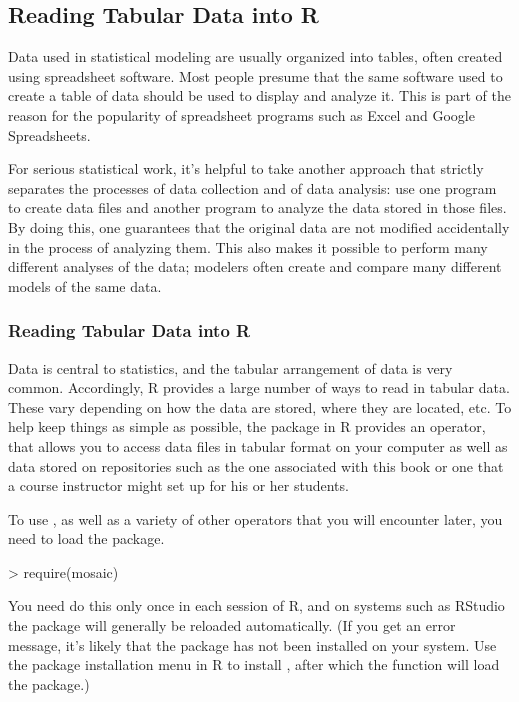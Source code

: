 
\subsection{Reading Tabular Data into R}

Data used in statistical modeling are usually organized into tables, 
often created using spreadsheet software. Most people
presume that the same software used to create a table of data should
be used to display and analyze it.  This is part of the reason for the
popularity of spreadsheet programs such as Excel and Google Spreadsheets.


For serious statistical work, it's helpful to take another approach that
strictly separates the processes of data collection and of data
analysis: use one program to create data files and another program to
analyze the data stored in those files.  
By doing this, one guarantees that the original data are
not modified accidentally in the process of analyzing them.  This also
makes it possible to perform many different analyses of the data;
modelers often create and compare many different models of the same
data.

\subsubsection{Reading Tabular Data into R}

Data is central to statistics, and the tabular arrangement
of data is very common.  Accordingly, R provides a large number of
ways to read in tabular
data.  These vary depending on how the data are stored, where they are
located, etc.  To help keep things as simple as possible, the 
package in R provides an operator,  that allows
you to access data files in tabular format on your computer as well as data stored on
repositories such as the one associated with this book or one that a
course instructor might set up for his or her students.


\label{sec:loading-mosaic}
To use , as well as a variety of other operators
that you will encounter later, you need to load the 
package. 
\begin{Schunk}
\begin{Sinput}
> require(mosaic)
\end{Sinput}
\end{Schunk}
You need do this only once in each session of R, and on systems such
as RStudio the package will generally be reloaded automatically.
(If you get an error message, it's likely that the  package
has not been installed on your system.  Use the package installation
menu in R to install , after which the 
function will load the package.)

